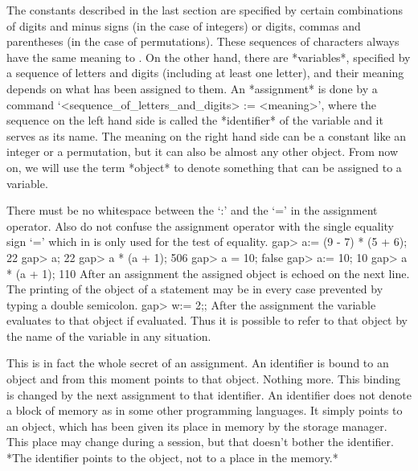 \null

The  constants described  in the  last  section are  specified by certain
combinations   of digits and  minus  signs (in  the case  of integers) or
digits,  commas  and parentheses  (in   the case  of permutations). These
sequences of characters always  have the same meaning  to {\GAP}.  On the
other hand, there are *variables*, specified by a sequence of letters and
digits (including at least one letter), and their meaning depends on what
has been  assigned to them.  An *assignment* is  done by a {\GAP} command
`<sequence_of_letters_and_digits> := <meaning>',  where the  sequence  on
the left hand side is called the *identifier*  of the variable and it serves
as its name. The meaning on the right hand side can be a constant like an
integer or  a  permutation, but  it can  also be almost  any other {\GAP}
object. From now on,  we will use the  term *object* to denote  something
that can be assigned to a variable.

There must be no whitespace between the `:' and the `=' in the assignment
operator.  Also do not confuse  the  assignment operator with the  single
equality sign `=' which in {\GAP} is only used for the test of equality.
\beginexample
gap> a:= (9 - 7) * (5 + 6);
22
gap> a;
22
gap> a * (a + 1);
506
gap> a = 10;
false
gap> a:= 10;
10
gap> a * (a + 1);
110
\endexample
After an assignment the assigned object is echoed on the  next line.  The
printing of the  object of a statement may  be in every case prevented by
typing a double semicolon.
\beginexample
gap> w:= 2;; 
\endexample
After the assignment the variable evaluates  to that object if evaluated.
Thus it is possible to  refer to that object by  the name of the variable
in any situation.

This is in fact the whole secret of an assignment. An identifier is bound
to an  object and from this moment  points to that object.  Nothing more.
This binding  is changed by the  next  assignment to that  identifier. An
identifier does not denote a block of memory as in some other programming
languages. It simply points to an object, which has  been given its place
in memory by the {\GAP} storage manager.   This place may change during a
{\GAP} session, but that doesn't  bother the identifier.  *The identifier
points to the object, not to a place in the memory.*


